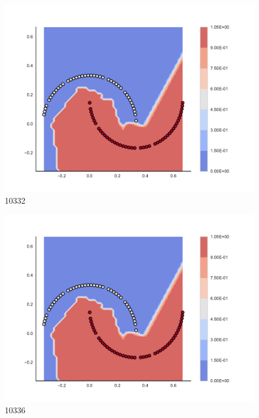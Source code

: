 \begin{subfigure}[b]{0.09\textwidth}
    \includegraphics[clip, trim=2.35cm 1.75cm 4.5cm 0cm,width=\textwidth]{img/convergence/10332.pdf}
    \caption{10332}
    \label{fig:convergence_10332}
\end{subfigure}
%
\begin{subfigure}[b]{0.09\textwidth}
    \includegraphics[clip, trim=2.35cm 1.75cm 4.5cm 0cm,width=\textwidth]{img/convergence/10336.pdf}
    \caption{10336}
    \label{fig:convergence_10336}
\end{subfigure}
%
